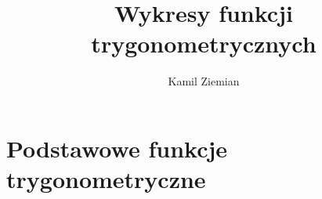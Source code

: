 \documentclass[a4paper,11pt]{article}
\title{Wykresy funkcji trygonometrycznych}
\author{Kamil Ziemian}
\numberwithin{equation}{section}
\begin{document}





\maketitle




















\section{Podstawowe funkcje trygonometryczne}

\label{sec:Funkcje-trygonometryczne}









\end{document}

